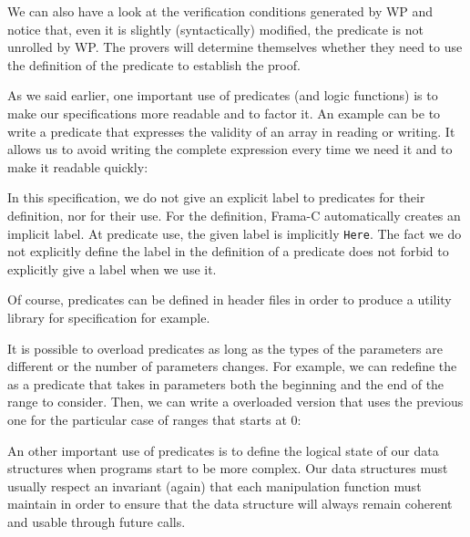 We can also have a look at the verification conditions generated by WP and
notice that, even it is slightly (syntactically) modified, the predicate is not
unrolled by WP. The provers will determine themselves whether they need to use
the definition of the predicate to establish the proof.






As we said earlier, one important use of predicates (and logic
functions) is to make our specifications more readable and to factor it.
An example can be to write a predicate that expresses the validity of an
array in reading or writing. It allows us to avoid writing the complete
expression every time we need it and to make it readable quickly:






In this specification, we do not give an explicit label to predicates
for their definition, nor for their use. For the definition, Frama-C
automatically creates an implicit label. At predicate use, the given
label is implicitly \texttt{Here}. The fact we do not explicitly define
the label in the definition of a predicate does not forbid to explicitly
give a label when we use it.

Of course, predicates can be defined in header files in order to produce
a utility library for specification for example.






It is possible to overload predicates as long as the types of the
parameters are different or the number of parameters changes. For
example, we can redefine the  as a
predicate that takes in parameters both the beginning and the end
of the range to consider. Then, we can write a overloaded version that
uses the previous one for the particular case of ranges that starts
at 0:









An other important use of predicates is to define the logical state of
our data structures when programs start to be more complex. Our data
structures must usually respect an invariant (again) that each
manipulation function must maintain in order to ensure that the data
structure will always remain coherent and usable through future calls.



